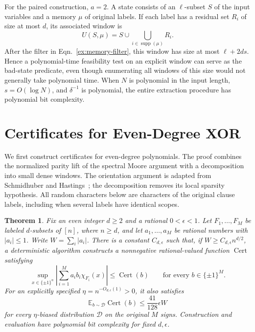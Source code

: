 \documentclass[letterpaper,11pt]{article}
\newtheorem{theorem}{Theorem}
\theoremstyle{definition}
\newcommand{\E}{\mathbb E}
\newcommand{\abs}[1]{\left|#1\right|}
\DeclareMathOperator{\supp}{supp}
\begin{document}
For the paired construction, $a=2$.  A state consists of an
$\ell$-subset $S$ of the input variables and a memory $\mu$ of
original labels.  If each label has a residual set $R_i$ of size at
most $d$, its associated window is
\[
  U(S,\mu)=S\cup\bigcup_{i\in\supp(\mu)}R_i.
\]
After the filter in Eqn.~\eqref{ex:memory-filter}, this window has
size at most $\ell+2ds$.  Hence a polynomial-time feasibility test
on an explicit window can serve as the bad-state predicate, even
though enumerating all windows of this size would not generally
take polynomial time.  When $N$ is polynomial in the input length,
$s=O(\log N)$, and $\delta^{-1}$ is polynomial, the entire
extraction procedure has polynomial bit complexity.



\section{Certificates for Even-Degree XOR}\label{sec:even}

We first construct certificates for even-degree polynomials. The proof
combines the normalized parity lift of the spectral Moore argument
with a decomposition into small dense windows. The orientation argument
is adapted from Schmidhuber and Hastings~\cite[Lemmas~2.5--2.7]{SH26Moore};
the decomposition removes its local sparsity hypothesis. All random
characters below are characters of the original clause labels, including
when several labels have identical scopes.

\begin{theorem}\label{thm:even-weight}
Fix an even integer $d\geq2$ and a rational $0<\epsilon<1$.
Let $F_1,\ldots,F_M$ be labeled $d$-subsets of $[n]$, where $n\geq d$,
and let $a_1,\ldots,a_M$ be rational numbers with $\abs{a_i}\leq1$.
Write $W=\sum_i\abs{a_i}$. There is a constant $C_{d,\epsilon}$ such that,
if $W\geq C_{d,\epsilon}n^{d/2}$, a deterministic algorithm constructs
a nonnegative rational-valued function $\operatorname{Cert}$ satisfying
\[
 \sup_{x\in\{\pm1\}^n}
 \abs{\sum_{i=1}^M a_i b_i\chi_{F_i}(x)}
 \leq\operatorname{Cert}(b)
 \qquad\text{for every }b\in\{\pm1\}^M.
\]
For an explicitly specified $\eta=n^{-O_{d,\epsilon}(1)}>0$, it also satisfies
\begin{equation}\label{even:main-expectation}
 \E_{b\sim\mathcal D}\operatorname{Cert}(b)
 \leq \frac{41}{128}\epsilon W
\end{equation}
for every $\eta$-biased distribution $\mathcal D$ on the original $M$ signs.
Construction and evaluation have polynomial bit complexity for fixed
$d,\epsilon$.
\end{theorem}
\end{document}
